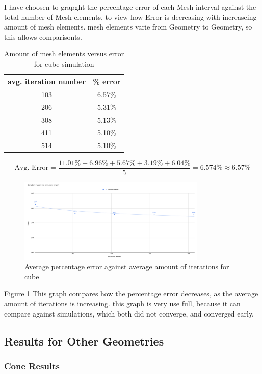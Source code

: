 \documentclass[12pt,a4paper]{article}
\begin{document}
I have choosen to grapght the percentage error of each Mesh interval against the total number of Mesh elements, to view how Error is decreasing with increaseing amount of mesh elements. mesh elements varie from Geometry to Geometry, so this allows comparisonts.

\begin{table}[H]
\centering
\caption{Amount of mesh elements versus error for cube simulation}
\label{tab:cube_elements_error}
\begin{tabular}{|c|c|}
\hline
\rowcolor{lightblue}
\textbf{avg. iteration number}& \textbf{\% error} \\
\hline
103& 6.57\%\\
\hline
206& 5.31\%\\
\hline
308& 5.13\%\\
\hline
411& 5.10\%\\
\hline
514& 5.10\%\\
\hline
\end{tabular}
\end{table}
\[
\text{Avg. Error} = \frac{11.01\% + 6.96\% + 5.67\% + 3.19\% + 6.04\%}{5}= 6.574\% \approx 6.57\%
\]
\begin{figure}[H]
    \centering
    \includegraphics[width=0.8\textwidth]{Bildschirmfoto 2025-08-24 um 14.13.37.png}
    \caption{Average percentage error against average amount of iterations for cube}
    \label{fig:cube_iterations_error}
\end{figure}

Figure \ref{fig:cube_iterations_error} This graph compares how the percentage error decreases, as the average amount of iterations is increasing. this graph is very use full, because it can compare against simulations, which both did not converge, and converged early.

\subsection{Results for Other Geometries}

\subsubsection{Cone Results}
\end{document}
